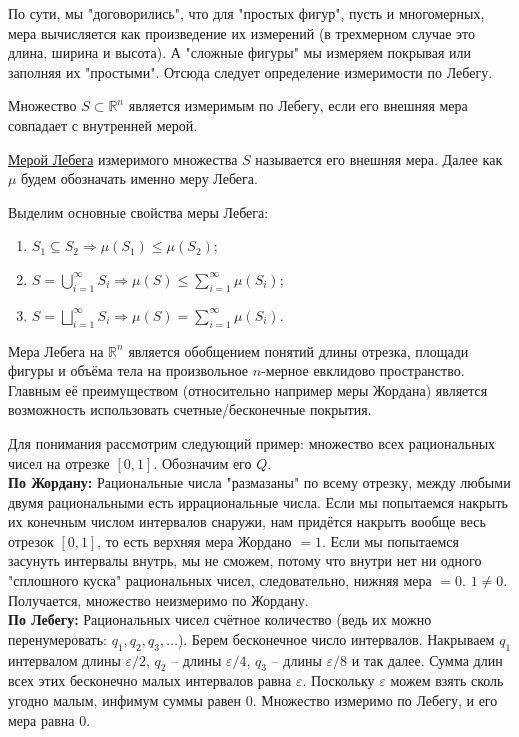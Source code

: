 По сути, мы "договорились", что для "простых фигур", пусть и многомерных, мера вычисляется как произведение их измерений (в трехмерном случае это длина, ширина и высота). А "сложные фигуры" мы измеряем покрывая или заполняя их "простыми". Отсюда следует определение измеримости по Лебегу.


\begin{definition}
Множество $S \subset \mathbb{R}^n$ является измеримым по Лебегу, если его внешняя мера совпадает с внутренней мерой.

\href{https://ru.wikipedia.org/wiki/Мера_Лебега}{Мерой Лебега}
 измеримого множества $S$ называется его внешняя мера. Далее как $\mu$ будем обозначать именно меру Лебега.
\end{definition}
\medskip

Выделим основные свойства меры Лебега:


\begin{enumerate}
    \item $S_1 \subseteq S_2 \Rightarrow \mu(S_1) \leqslant \mu(S_2)$;
    \item $S = \bigcup_{i=1}^{\infty} S_i \Rightarrow \mu(S) \leqslant \sum_{i=1}^{\infty} \mu(S_i)$;
    \item $S = \bigsqcup_{i=1}^{\infty} S_i \Rightarrow \mu(S) = \sum_{i=1}^{\infty} \mu(S_i)$.
\end{enumerate}

Мера Лебега на $\mathbb{R}^n$ является обобщением понятий длины отрезка, площади фигуры и объёма тела на произвольное $n$-мерное евклидово пространство. Главным её преимуществом (относительно например меры Жордана) является возможность использовать счетные/бесконечные покрытия.

\bigskip
Для понимания рассмотрим следующий пример: множество всех рациональных чисел на отрезке $[0, 1]$. Обозначим его $Q$.\\
\smallskip
\textbf{По Жордану:} Рациональные числа "размазаны" по всему отрезку, между любыми двумя рациональными есть иррациональные числа. Если мы попытаемся накрыть их конечным числом интервалов снаружи, нам придётся накрыть вообще весь отрезок $[0, 1]$, то есть верхняя мера Жордано $= 1$. Если мы попытаемся засунуть интервалы внутрь, мы не сможем, потому что внутри нет ни одного "сплошного куска" рациональных чисел, следовательно, нижняя мера $= 0$. $1 \neq 0$. Получается, множество неизмеримо по Жордану.\\

\textbf{По Лебегу:} Рациональных чисел счётное количество (ведь их можно перенумеровать: $q_1, q_2, q_3, \ldots$). Берем бесконечное число интервалов. Накрываем $q_1$ интервалом длины $\varepsilon/2$, $q_2$ -- длины $\varepsilon/4$, $q_3$ -- длины $\varepsilon/8$ и так далее. Сумма длин всех этих бесконечно малых интервалов равна $\varepsilon$. Поскольку $\varepsilon$ можем взять сколь угодно малым, инфимум суммы равен $0$. Множество измеримо по Лебегу, и его мера равна $0$.

